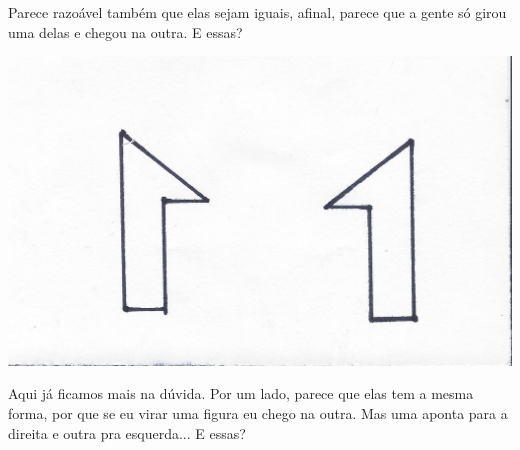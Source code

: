 \documentclass[twoside, 12pt]{article}
\begin{document}
Parece razoável também que elas sejam iguais, afinal, parece que a gente
só girou uma delas e chegou na outra. E essas?

\begin{center}
  \includegraphics[height=0.2\textheight]{img/03-3}
\end{center}

Aqui já ficamos mais na dúvida. Por um lado, parece que elas tem a mesma
forma, por que se eu virar uma figura eu chego na outra. Mas uma aponta
para a direita e outra pra esquerda... E essas?
\end{document}
